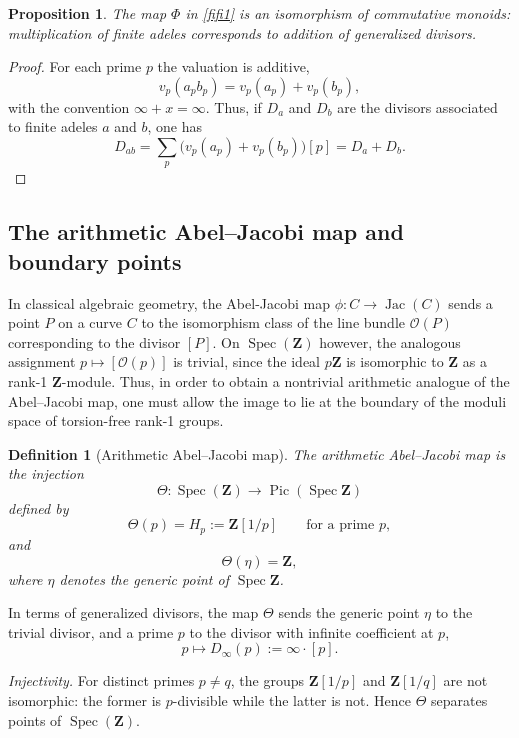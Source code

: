 \documentclass[11pt,a4paper]{article}
\newcommand{\Z}{\mathbf{Z}}
\def\spz{\Spec \Z}
\newcommand{\Spec}{\operatorname{Spec}}
\def\Pic{\operatorname{Pic}}
\def\spz{\Spec \Z}
\theoremstyle{plain}
\newtheorem{defn}[thm]{Definition}
\newtheorem{prop}[thm]{Proposition}
\theoremstyle{definition} %
\begin{document}
\begin{prop}\label{ident}
The map $\Phi$ in \eqref{fifi1} is an isomorphism of commutative
monoids: multiplication of finite adeles corresponds to addition of generalized
divisors.
\end{prop}

\begin{proof}
For each prime $p$ the valuation is additive,
\[
v_p(a_p b_p)=v_p(a_p)+v_p(b_p),
\]
with the convention $\infty+x=\infty$.
Thus, if $D_a$ and $D_b$ are the divisors associated to finite adeles $a$ and $b$, one has
\[
D_{ab}=\sum_p\bigl(v_p(a_p)+v_p(b_p)\bigr)[p]=D_a+D_b.
\]
\end{proof}




\subsection{The arithmetic Abel--Jacobi map and boundary points}

In classical algebraic geometry, the Abel-Jacobi map $\phi: C \to \operatorname{Jac}(C)$ sends a point $P$ on a curve $C$ to the isomorphism class of the line bundle $\mathcal{O}(P)$ corresponding to the divisor $[P]$.
On $\Spec(\Z)$ however, the analogous assignment
$p\mapsto[\mathcal O(p)]$ is trivial, since the ideal $p\Z$ is isomorphic to $\Z$
as a rank-1 $\Z$-module.
Thus, in order to obtain a nontrivial arithmetic analogue of the Abel--Jacobi map,
one must allow the image to lie at the boundary of the moduli space of torsion-free
rank-1 groups.

\begin{defn}[Arithmetic Abel--Jacobi map]\label{aAJ}
The \emph{arithmetic Abel--Jacobi map} is the injection
\[
\Theta:\Spec(\Z)\longrightarrow \Pic(\spz)
\]
defined by
\[
\Theta(p)=H_p:=\Z[1/p]\qquad\text{for a prime }p,
\]
and
\[
\Theta(\eta)=\Z,
\]
where $\eta$ denotes the generic point of $\spz$.
\end{defn}

In terms of generalized divisors, the map $\Theta$ sends the generic point $\eta$
to the trivial divisor, and a prime $p$ to the divisor with infinite coefficient
at $p$,
\[
p\longmapsto D_\infty(p):=\infty\cdot[p].
\]

\emph{Injectivity.}
For distinct primes $p\neq q$, the groups $\Z[1/p]$ and $\Z[1/q]$ are not isomorphic:
the former is $p$-divisible while the latter is not.
Hence $\Theta$ separates points of $\Spec(\Z)$.\vspace{.02in}
\end{document}
